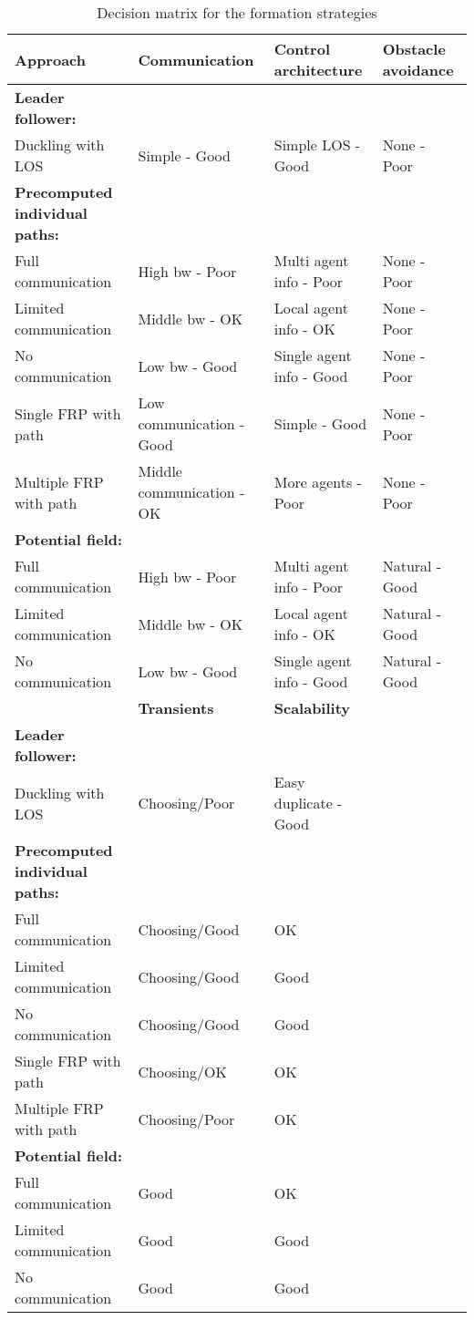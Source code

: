 \begin{sidewaystable}
\begin{tabular}{l|lll}
\toprule
\textbf{Approach} & \textbf{Communication} & \textbf{Control architecture} & \textbf{Obstacle avoidance} \\
\hline
\textbf{Leader follower:}&&&\\
Duckling with LOS& Simple - Good & Simple LOS - Good & None - Poor \\
\textbf{Precomputed individual paths:}&&&\\
Full communication& High bw - Poor & Multi agent info - Poor & None - Poor \\
Limited communication& Middle bw - OK & Local agent info - OK & None - Poor \\
No communication& Low bw - Good & Single agent info - Good & None - Poor \\
Single \ac{FRP} with path& Low communication - Good & Simple - Good & None - Poor \\
Multiple \ac{FRP} with path& Middle communication - OK & More agents - Poor & None - Poor \\
\textbf{Potential field:}&&&\\
Full communication& High bw - Poor & Multi agent info - Poor & Natural - Good \\
Limited communication& Middle bw - OK & Local agent info - OK & Natural - Good \\
No communication& Low bw - Good & Single agent info - Good & Natural - Good\\
\bottomrule
 & \textbf{Transients} & \textbf{Scalability}\\
\hline
\textbf{Leader follower:}&&&\\
Duckling with LOS   & Choosing/Poor & Easy duplicate - Good\\
\textbf{Precomputed individual paths:}&&&\\
Full communication   & Choosing/Good & OK\\
Limited communication   & Choosing/Good & Good\\
No communication   & Choosing/Good & Good\\
Single \ac{FRP} with path   & Choosing/OK & OK\\
Multiple \ac{FRP} with path   & Choosing/Poor & OK\\
\textbf{Potential field:}&&&\\
Full communication    & Good & OK\\
Limited communication    & Good & Good\\
No communication    & Good & Good\\
\end{tabular}
\caption{Decision matrix for the formation strategies}
\label{tab:decision-matrix}
\end{sidewaystable}

